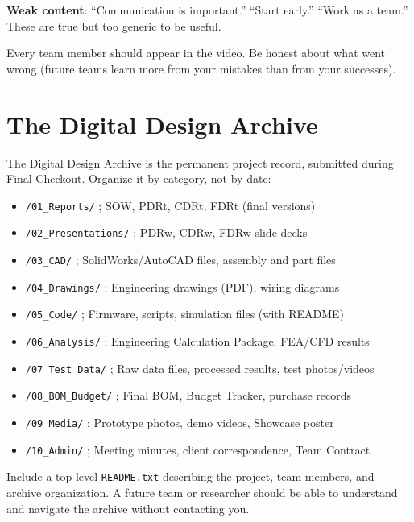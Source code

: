 \textbf{Weak content}: ``Communication is important.'' ``Start early.'' ``Work as a team.'' These are true but too generic to be useful.

Every team member should appear in the video. Be honest about what went wrong (future teams learn more from your mistakes than from your successes).

\section{The Digital Design Archive}
The Digital Design Archive is the permanent project record, submitted during Final Checkout. Organize it by category, not by date:

\begin{itemize}[nosep,leftmargin=1.5em]
\item \texttt{/01\_Reports/} ;  SOW, PDRt, CDRt, FDRt (final versions)
\item \texttt{/02\_Presentations/} ;  PDRw, CDRw, FDRw slide decks
\item \texttt{/03\_CAD/} ;  SolidWorks/AutoCAD files, assembly and part files
\item \texttt{/04\_Drawings/} ;  Engineering drawings (PDF), wiring diagrams
\item \texttt{/05\_Code/} ;  Firmware, scripts, simulation files (with README)
\item \texttt{/06\_Analysis/} ;  Engineering Calculation Package, FEA/CFD results
\item \texttt{/07\_Test\_Data/} ;  Raw data files, processed results, test photos/videos
\item \texttt{/08\_BOM\_Budget/} ;  Final BOM, Budget Tracker, purchase records
\item \texttt{/09\_Media/} ;  Prototype photos, demo videos, Showcase poster
\item \texttt{/10\_Admin/} ;  Meeting minutes, client correspondence, Team Contract
\end{itemize}

Include a top-level \texttt{README.txt} describing the project, team members, and archive organization. A future team or researcher should be able to understand and navigate the archive without contacting you.




